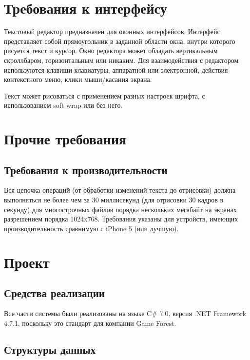 \documentclass{fefu}
\begin{document}
	\section{Требования к интерфейсу}
		\par Текстовый редактор предназначен для оконных интерфейсов. Интерфейс представляет
		собой прямоугольник в заданной области окна, внутри которого рисуется текст и курсор. Окно редактора может обладать 
		вертикальным скроллбаром, горизонтальным или никаким. Для взаимодействия с редактором
		используются клавиши клавиатуры, 
		аппаратной или электронной, действия контекстного меню, клики мыши/касания экрана.
		\par Текст может рисоваться с применением разных настроек шрифта, с использованием soft
		wrap или без него.
	\section{Прочие требования}
		\subsection{Требования к производительности}
			Вся цепочка операций (от обработки изменений текста до 
			отрисовки) должна выполняться не более чем за 30 миллисекунд (для отрисовки 30 
			кадров в секунду) для многострочных файлов порядка нескольких мегабайт на экранах
			разрешением порядка 1024x768. Требования указаны для устройств, имеющих
			производительность сравнимую с iPhone 5 (или лучшую).
	\section{Проект}
		\subsection{Средства реализации}
			Все части системы были реализованы на языке C\# 7.0, 
			версия .NET Framework 4.7.1, поскольку это стандарт для компании Game Forest.
		\subsection{Структуры данных}
\end{document}
